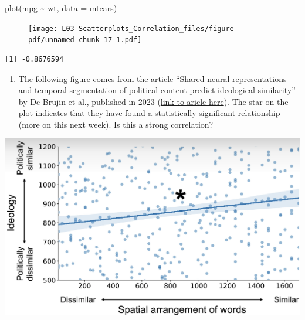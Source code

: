 \documentclass[
  letterpaper,
  DIV=11,
  numbers=noendperiod,
  oneside]{scrreprt}
\newenvironment{Shaded}{\begin{snugshade}}{\end{snugshade}}
\newcommand{\AttributeTok}[1]{\textcolor[rgb]{0.40,0.45,0.13}{#1}}
\newcommand{\FunctionTok}[1]{\textcolor[rgb]{0.28,0.35,0.67}{#1}}
\newcommand{\NormalTok}[1]{\textcolor[rgb]{0.00,0.23,0.31}{#1}}
\newcommand{\SpecialCharTok}[1]{\textcolor[rgb]{0.37,0.37,0.37}{#1}}
\providecommand{\tightlist}{%
  \setlength{\itemsep}{0pt}\setlength{\parskip}{0pt}}\usepackage{longtable,booktabs,array}
\begin{document}
\begin{Shaded}
\begin{Highlighting}[]
\FunctionTok{plot}\NormalTok{(mpg }\SpecialCharTok{\textasciitilde{}}\NormalTok{ wt, }\AttributeTok{data =}\NormalTok{ mtcars)}
\end{Highlighting}
\end{Shaded}

\begin{figure}[H]

{\centering \texttt{[image: L03-Scatterplots\_Correlation\_files/figure-pdf/unnamed-chunk-17-1.pdf]}

}

\end{figure}

\begin{Shaded}
\end{Shaded}

\begin{verbatim}
[1] -0.8676594
\end{verbatim}

\begin{enumerate}
\def\labelenumi{\arabic{enumi}.}
\setcounter{enumi}{1}
\tightlist
\item
  The following figure comes from the article ``Shared neural
  representations and temporal segmentation of political content predict
  ideological similarity'' by De Brujin et al., published in 2023
  (\href{https://www.science.org/doi/10.1126/sciadv.abq5920}{link to
  aricle here}). The star on the plot indicates that they have found a
  statistically significant relationship (more on this next week). Is
  this a strong correlation?
\end{enumerate}

\includegraphics{figs/scatterbad.png}
\end{document}
